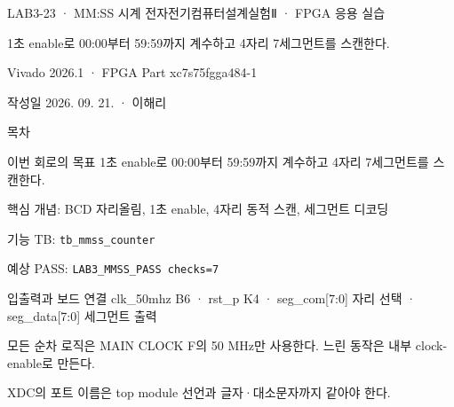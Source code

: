 

\renewcommand{\small}{\fontsize{8.7}{10.5}\selectfont}
\setlength{\leftmargini}{1.35em}

\begin{frame}{LAB3-23 · MM:SS 시계}
\small
전자전기컴퓨터설계실험Ⅱ · FPGA 응용 실습\par\vspace{0.28cm}
1초 enable로 00:00부터 59:59까지 계수하고 4자리 7세그먼트를 스캔한다.\par\vspace{0.28cm}
Vivado 2026.1 · FPGA Part xc7s75fgga484-1\par\vspace{0.28cm}
작성일 2026. 09. 21. · 이해리
\end{frame}

\begin{frame}[label=lab3-contents]{목차}
\small
{}\par\vspace{0.28cm}
\par\vspace{0.28cm}
\par\vspace{0.28cm}
\par\vspace{0.28cm}
\par\vspace{0.28cm}
\end{frame}

\begin{frame}[label=goal]{이번 회로의 목표}
\small
1초 enable로 00:00부터 59:59까지 계수하고 4자리 7세그먼트를 스캔한다.\par\vspace{0.28cm}
핵심 개념: BCD 자리올림, 1초 enable, 4자리 동적 스캔, 세그먼트 디코딩\par\vspace{0.28cm}
기능 TB: \texttt{tb\_mmss\_counter}\par\vspace{0.18cm}
예상 PASS: \texttt{LAB3\_MMSS\_PASS checks=7}
\end{frame}

\begin{frame}{입출력과 보드 연결}
\small
clk\_50mhz B6 · rst\_p K4 · seg\_com[7:0] 자리 선택 · seg\_data[7:0] 세그먼트 출력\par\vspace{0.32cm}
모든 순차 로직은 MAIN CLOCK F의 50 MHz만 사용한다. 느린 동작은 내부 clock-enable로 만든다.\par\vspace{0.28cm}
XDC의 포트 이름은 top module 선언과 글자·대소문자까지 같아야 한다.
\end{frame}

